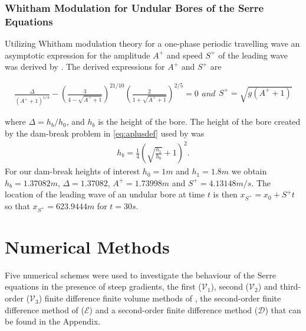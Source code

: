 \documentclass[times]{elsarticle}
\begin{document}
\subsubsection{Whitham Modulation for Undular Bores of the Serre Equations}
Utilizing Whitham modulation theory for a one-phase periodic travelling wave an asymptotic expression for the amplitude $A^+$ and speed $S^+$ of the leading wave was derived by \citet{El-etal-2006}. The derived expressions for $A^+$ and $S^+$ are
\begin{linenomath*}
	\begin{subequations}
		\begin{gather}
		\frac{\Delta}{\left(A^+ + 1\right)^{1/4}} - \left(\frac{3}{4 -  \sqrt{A^+ + 1}}\right)^{21/10} \left(\frac{2}{1 + \sqrt{A^+ + 1}}\right)^{2/5} = 0
		\label{eq:aplusdef}
		\end{gather}
		and
		\begin{gather}
		S^+ = \sqrt{g \left(A^+ + 1\right)}
		\label{eq:splusdef}
		\end{gather}
		\label{eq:ELWhitMod}	
	\end{subequations}
\end{linenomath*}
where $\Delta = h_b / h_0$, and $h_b$ is the height of the bore. The height of the bore created by the dam-break problem in \eqref{eq:aplusdef} used by \citet{El-etal-2006} was
\begin{gather*}
\label{eqn:hrdef}
h_b = \frac{1}{4}\left(\sqrt{\frac{h_1}{h_0}} + 1\right)^2.
\end{gather*} 
For our dam-break heights of interest $h_0 = 1m$ and $h_1 = 1.8m$ we obtain $h_b = 1.37082m$, $\Delta = 1.37082$, $A^+ = 1.73998m$ and $S^+ = 4.13148m/s$. The location of the leading wave of an undular bore at time $t$ is then $x_{S^+} = x_0 + S^+ t$ so that $x_{S^+} = 623.9444m$ for $t=30s$.

\section{Numerical Methods}
\label{sec:nummeth}
Five numerical schemes were used to investigate the behaviour of the Serre equations in the presence of steep gradients, the first ($\mathcal{V}_1$), second ($\mathcal{V}_2$) and third-order ($\mathcal{V}_3$) finite difference finite volume methods of  \citet{Zoppou-etal-2017}, the second-order finite difference method of \citet{El-etal-2006} ($\mathcal{E}$) and a second-order finite difference method ($\mathcal{D}$) that can be found in the Appendix.
\end{document}

